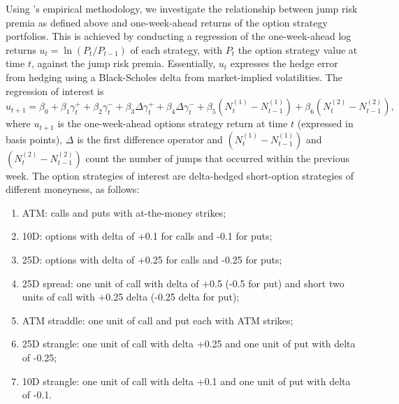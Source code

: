 \documentclass[11pt,a4paper]{article}
\numberwithin{equation}{section}
\theoremstyle{remark}
\theoremstyle{definition}
\begin{document}
Using \cite{bakshi2003delta}'s empirical methodology, we investigate the relationship between jump risk premia as defined above and one-week-ahead returns of the option strategy portfolios.
This is achieved by conducting a regression of the one-week-ahead log returns $u_t= \ln(P_t/P_{t-1})$ of each strategy, with $P_t$ the option strategy value at time $t$, against the jump risk premia. Essentially, $u_t$ expresses the hedge error from hedging using a Black-Scholes delta from market-implied volatilities.
The regression of interest is
\begin{equation}
    u_{t+1} = \beta_0 + \beta_1 \gamma^+_t + \beta_2 \gamma^-_t %
     + \beta_3 \Delta \gamma^+_t + \beta_4 \Delta \gamma^-_t %
     + \beta_5 (N^{(1)}_t-N^{(1)}_{t-1})
    + \beta_6  (N^{(2)}_t-N^{(2)}_{t-1}),
    \label{regression_optionstrategies}
\end{equation}
where $u_{t+1}$ is the one-week-ahead options strategy return at time $t$ (expressed in basis points),
$\Delta$ is the first difference operator and
$(N^{(1)}_t-N^{(1)}_{t-1})$ and $(N^{(2)}_t-N^{(2)}_{t-1})$ count the number of jumps that occurred within the previous week.
The option strategies of interest are delta-hedged short-option strategies of different moneyness, as follows:
\begin{enumerate}[label=(\roman*)]
\item ATM: calls and puts with at-the-money strikes;
\item 10D: options with delta of +0.1 for calls and -0.1 for puts;
\item 25D: options with delta of +0.25 for calls and -0.25 for puts;
\item 25D spread: one unit of call with delta of +0.5 (-0.5 for put) and short two units of call with +0.25 delta (-0.25 delta for put);
\item ATM straddle: one unit of call and put each with ATM strikes;
\item 25D strangle: one unit of call with delta +0.25 and one unit of put with delta of -0.25;
\item 10D strangle: one unit of call with delta +0.1 and one unit of put with delta of -0.1.
\end{enumerate}
\end{document}
